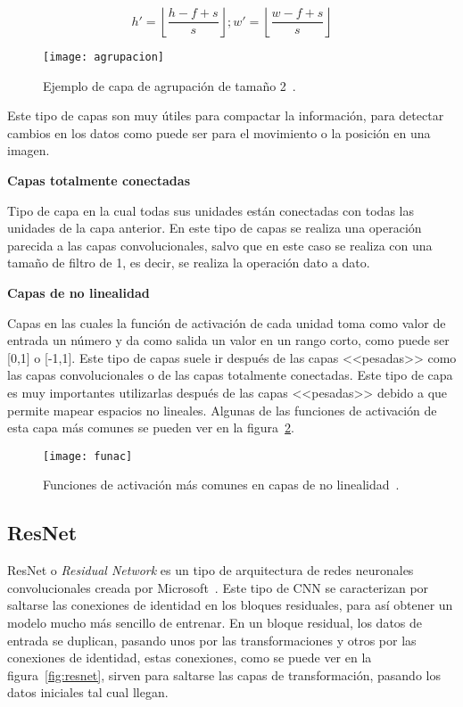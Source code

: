 \begin{equation}
h'=\left \lfloor \frac{h-f+s}{s} \right \rfloor;w'=\left \lfloor \frac{w-f+s}{s} \right \rfloor
\end{equation}

\begin{figure}[h]
	\centering
	\texttt{[image: agrupacion]}
	\caption{Ejemplo de capa de agrupación de tamaño 2~\cite{cnn}.}
	\label{fig:agrupacion}
\end{figure}

Este tipo de capas son muy útiles para compactar la información, para detectar cambios en los datos como puede ser para el movimiento o la posición en una imagen.

\textbf{Capas totalmente conectadas}

Tipo de capa en la cual todas sus unidades están conectadas con todas las unidades de la capa anterior. En este tipo de capas se realiza una operación parecida a las capas convolucionales, salvo que en este caso se realiza con una tamaño de filtro de 1, es decir, se realiza la operación dato a dato. 

\textbf{Capas de no linealidad}

Capas en las cuales la función de activación de cada unidad toma como valor de entrada un número y da como salida un valor en un rango corto, como puede ser [0,1] o [-1,1]. Este tipo de capas suele ir después de las capas <<pesadas>> como las capas convolucionales o de las capas totalmente conectadas. Este tipo de capa es muy importantes utilizarlas después de las capas <<pesadas>> debido a que permite mapear espacios no lineales. Algunas de las funciones de activación de esta capa más comunes se pueden ver en la figura~\ref{fig:funac}.

\begin{figure}[h]
	\centering
	\texttt{[image: funac]}
	\caption{Funciones de activación más comunes en capas de no linealidad~\cite{cnn}.}
	\label{fig:funac}
\end{figure}
\subsection{ResNet}
ResNet o \textit{Residual Network} es un tipo de arquitectura de redes neuronales convolucionales creada por Microsoft~\cite{resnet}. Este tipo de CNN se caracterizan por saltarse las conexiones de identidad en los bloques residuales, para así obtener un modelo mucho más sencillo de entrenar. En un bloque residual, los datos de entrada se duplican, pasando unos por las transformaciones y otros por las conexiones de identidad, estas conexiones, como se puede ver en la figura~\ref{fig:resnet}, sirven para saltarse las capas de transformación, pasando los datos iniciales tal cual llegan.

